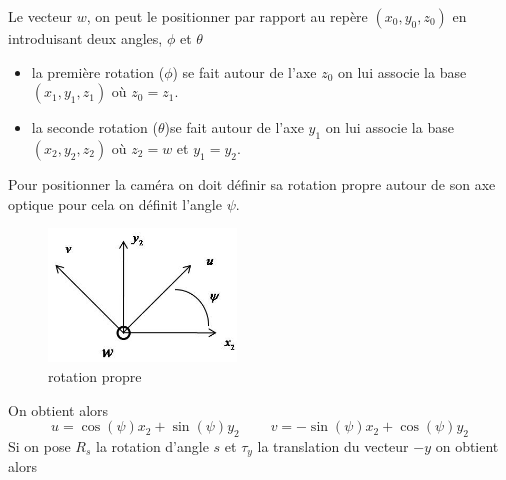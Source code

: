 Le vecteur $w$, on peut le positionner par rapport au repère $(x_{0},y_{0},z_{0}) $ en introduisant deux angles, $\phi$ et $\theta$
\begin{itemize}
\item la première rotation ($\phi$) se fait autour de l'axe $z_{0}$ on lui associe la base $(x_{1},y_{1},z_{1})$ où $z_{0}=z_{1}$.
\item la seconde rotation ($\theta$)se fait autour de l'axe $y_{1}$ on lui associe la base $(x_{2},y_{2},z_{2})$ où $z_{2}=w$ et $y_{1}=y_{2}$.
\end{itemize}
\begin{figure}[h!]
\centering
{}

\end{figure}
Pour positionner la caméra on doit définir sa rotation propre autour de son axe optique pour cela on définit l'angle $\psi$.\\
\begin{figure}[h!]
\centering
\includegraphics[width=5cm]{graphe3.jpg}
\caption{rotation propre}
\end{figure}
On obtient alors 
\begin{equation*}
u=\cos(\psi)x_{2}+\sin(\psi)y_{2}~~~~~~~~~~v=-\sin(\psi)x_{2}+\cos(\psi)y_{2}
\end{equation*}
Si on pose $R_{s}$ la rotation d'angle $s$ et $\tau_{y}$ la translation du vecteur $-y$ on obtient alors 

